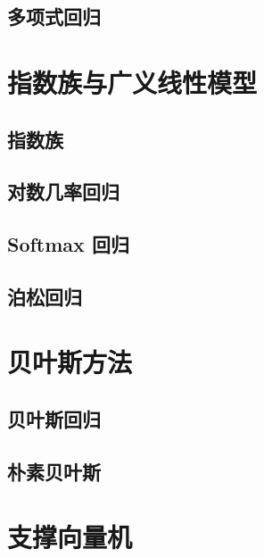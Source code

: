 
\subsection{多项式回归} %
\label{sub:多项式回归}



\section{指数族与广义线性模型} %
\label{sec:指数族与广义线性模型}
\subsection{指数族} %
\label{sub:指数族}

\subsection{对数几率回归} %
\label{sub:对数几率回归}


\subsection{Softmax 回归} %
\label{sub:softmax_回归}


\subsection{泊松回归} %
\label{sub:泊松回归}



\section{贝叶斯方法} %
\label{sec:贝叶斯方法}

\subsection{贝叶斯回归} %
\label{sub:贝叶斯回归}


\subsection{朴素贝叶斯} %
\label{sub:朴素贝叶斯}






\section{支撑向量机} %
\label{sec:支撑向量机}



